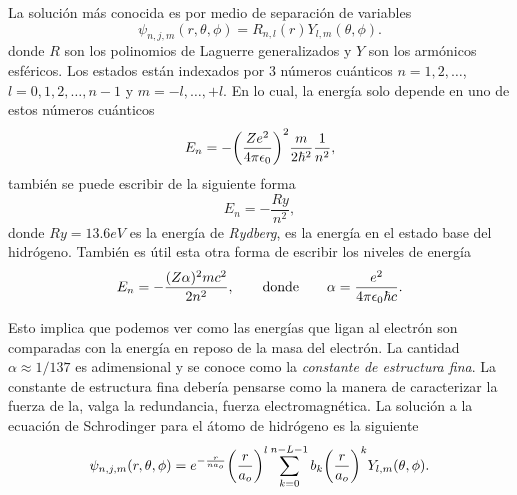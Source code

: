 La solución más conocida es por medio de separación de variables
    \begin{equation}
        \psi _{n,j,m} (r,\theta,\phi) = R_{n,l} (r) Y _{l,m} (\theta ,\phi).
    \end{equation}
donde $R$ son los polinomios de Laguerre generalizados y $Y$ son los armónicos esféricos. Los estados están indexados por $3$ números cuánticos $n = 1,2,\ldots$, $l = 0,1,2,\ldots ,n-1$ y $m = -l, \ldots ,+l$. En lo cual, la energía solo depende en uno de estos números cuánticos
    \begin{equation}
        E_n = - \qty(\frac{Z e^2}{4\pi \epsilon_0})^2 \frac{m}{2\hbar ^2} \frac{1}{n^2},
    \end{equation}
también se puede escribir de la siguiente forma
\begin{equation*}
    E_n = - \frac{ Ry}{n^2},
\end{equation*}
donde $Ry = 13.6eV$ es la energía de \textit{Rydberg}, es la energía en el estado base del hidrógeno. También es útil esta otra forma de escribir los niveles de energía
    \begin{equation}
        E_n = -\frac{(Z\alpha)^2 mc^2}{2n^2}, \qquad \text{donde} \qquad \alpha = \frac{e^2}{4\pi \epsilon_0 \hbar c}.
    \end{equation}

Esto implica que podemos ver como las energías que ligan al electrón son comparadas con la energía en reposo de la masa del electrón. La cantidad $\alpha \approx 1/137$ es adimensional y se conoce como la \textit{constante de estructura fina}. La constante de estructura fina debería pensarse como la manera de caracterizar la fuerza de la, valga la redundancia, fuerza electromagnética. La solución a la ecuación de Schrodinger para el átomo de hidrógeno es la siguiente
\begin{equation}
    \psi _{n,j,m} (r,\theta,\phi) = e^{-\frac{r}{na_o}} \qty(\frac{r}{a_o})^l \sum _{k=0} ^{n - L - 1} b_k \qty(\frac{r}{a_o})^k Y_{l,m} (\theta ,\phi).
\end{equation}








































